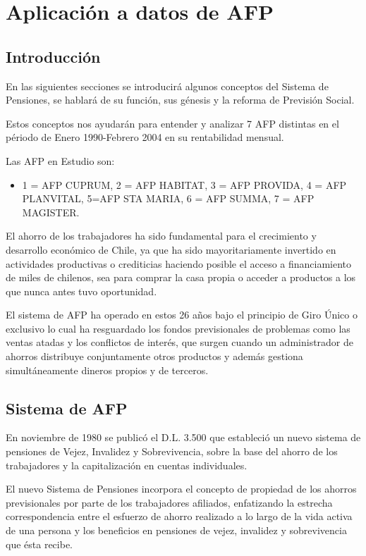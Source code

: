 \def\baselinestretch{1}
\chapter{Aplicaci\'on a datos de AFP}
\def\baselinestretch{1.0}
\goodbreak
\section{Introducci\'on}
En las siguientes secciones se introducir\'a algunos conceptos
del Sistema de Pensiones, se hablar\'a de su funci\'on, sus g\'enesis y la reforma de Previsi\'on
 Social.

Estos conceptos nos ayudar\'an para entender y analizar 7 AFP distintas en el p\'eriodo de Enero 1990-Febrero 2004
en su rentabilidad mensual.

Las AFP en Estudio son:
\begin{itemize}
\item 1 = AFP CUPRUM, 2 = AFP HABITAT, 3 = AFP PROVIDA, 4 = AFP PLANVITAL, 5\-=\-AFP STA MARIA, 6 = AFP SUMMA, 7 = AFP MAGISTER.
\end{itemize}

El ahorro de los trabajadores ha sido fundamental para el crecimiento y
desarrollo econ\'omico de Chile, ya que ha sido mayoritariamente invertido en
actividades productivas o crediticias haciendo posible el acceso a financiamiento
de miles de chilenos, sea para comprar la casa propia o acceder a productos a los
que nunca antes tuvo oportunidad.

El sistema de AFP ha operado en estos 26 a\~nos bajo el principio de Giro \'Unico
o exclusivo lo cual ha resguardado los fondos previsionales de problemas como
las ventas atadas y los conflictos de inter\'es, que surgen cuando un administrador
de ahorros distribuye conjuntamente otros productos y adem\'as gestiona
simult\'aneamente dineros propios y de terceros.

\section{Sistema de AFP}

En noviembre de 1980 se public\'o el D.L. 3.500 que estableci\'o un nuevo sistema de pensiones de Vejez, Invalidez y Sobrevivencia, sobre la base del ahorro de los trabajadores y la capitalizaci\'on en cuentas individuales.

El nuevo Sistema de Pensiones incorpora el concepto de propiedad de los ahorros previsionales por parte de los trabajadores afiliados, enfatizando la estrecha correspondencia entre el esfuerzo de ahorro realizado a lo largo de la vida activa de una persona y los beneficios en pensiones de vejez, invalidez y sobrevivencia que \'esta recibe.


